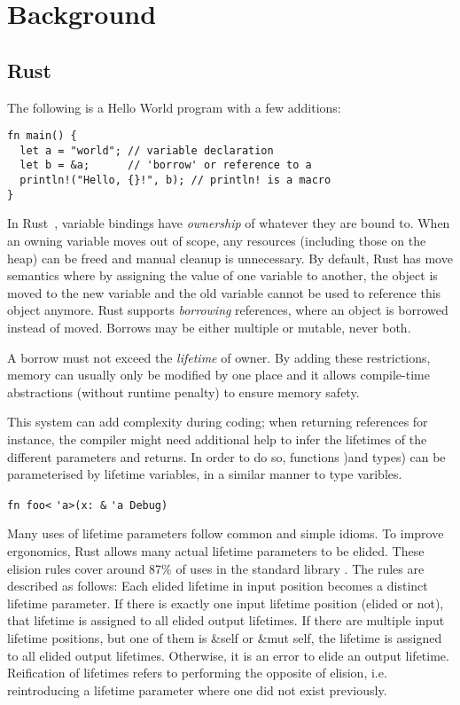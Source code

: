 \section{Background}\label{C:back} 

\subsection{Rust}

The following is a Hello World program with a few additions:

\begin{verbatim}
fn main() {
  let a = "world"; // variable declaration
  let b = &a;      // 'borrow' or reference to a
  println!("Hello, {}!", b); // println! is a macro
}
\end{verbatim}

In Rust~\cite{doc15}, variable bindings have \textit{ownership} of whatever they are bound to. When an owning variable moves out of scope, any resources (including those on the heap) can be freed and manual cleanup is unnecessary. By default, Rust has move semantics where by assigning the value of one variable to another, the object is moved to the new variable and the old variable cannot be used to reference this object anymore. Rust supports \textit{borrowing} references, where an object is borrowed instead of moved. Borrows may be either multiple or mutable, never both.

A borrow must not exceed the \textit{lifetime} of owner. By adding these restrictions, memory can usually only be modified by one place and it allows compile-time abstractions (without runtime penalty) to ensure memory safety.

This system can add complexity during coding; when returning references for instance, the compiler might need additional help to infer the lifetimes of the different parameters and returns. In order to do so, functions )and types) can be parameterised by lifetime variables, in a similar manner to type varibles.

{\verb|fn foo<|}{\color{blue} \verb|'a|}{\verb|>(x: &|}
{\color{blue} \verb|'a|}{\verb| Debug)|}

Many uses of lifetime parameters follow common and simple idioms. To improve ergonomics, Rust allows many actual lifetime parameters to be elided. These elision rules cover around 87\% of uses in the standard library \cite{elisionrules}. The rules are described as follows: Each elided lifetime in input position becomes a distinct lifetime parameter. If there is exactly one input lifetime position (elided or not), that lifetime is assigned to all elided output lifetimes. If there are multiple input lifetime positions, but one of them is \&self or \&mut self, the lifetime is assigned to all elided output lifetimes. Otherwise, it is an error to elide an output lifetime. Reification of lifetimes refers to performing the opposite of elision, i.e. reintroducing a lifetime parameter where one did not exist previously.


